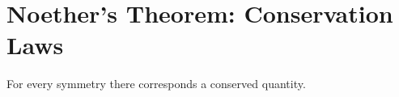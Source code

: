\section{Noether's Theorem: Conservation Laws}

\label{sec:noether}
\begin{thm}
	For every symmetry there corresponds a conserved quantity.\cite{Noether2005Invariant}
\end{thm}
\lipsum
